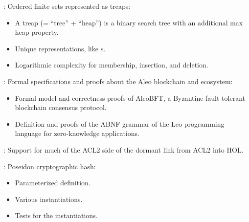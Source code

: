 \begin{frame}

\newlibtitle

:
Ordered finite sets represented as treaps:
\begin{itemize}
\item A treap (= ``tree'' + ``heap'') is a binary search tree with an
      additional max heap property.
\item Unique representations, like s.
\item Logarithmic complexity for membership, insertion, and deletion.
\end{itemize}

\end{frame}


\begin{frame}

\newlibtitle

:
Formal specifications and proofs about the Aleo blockchain and ecosystem:
\begin{itemize}
\item Formal model and correctness proofs of AleoBFT,
      a Byzantine-fault-tolerant blockchain consensus protocol.
\item Definition and proofs of the ABNF grammar of
      the Leo programming language for zero-knowledge applications.
\end{itemize}

\end{frame}


\begin{frame}

\newlibtitle

:
Support for much of the ACL2 side of the dormant link from ACL2 into HOL.

\end{frame}


\begin{frame}

\newlibtitle

:
Poseidon cryptographic hash:
\begin{itemize}
\item Parameterized definition.
\item Various instantiations.
\item Tests for the instantiations.
\end{itemize}

\end{frame}

